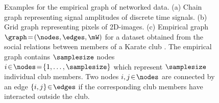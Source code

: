 \documentclass[12pt]{report}
\begin{document}
\begin{figure}[htbp]
\begin{center}
\begin{minipage}[b]{.8\textwidth} 
\begin{center}
\end{center}
\end{minipage}
\end{center}
\caption{\label{fig_graph_signals} Examples for the empirical graph of networked data. (a) 
Chain graph representing signal amplitudes of discrete time signals.  (b) Grid graph representing 
pixels of 2D-images. (c) Empirical graph $\graph\!=\!(\nodes,\edges,\mW)$ for a dataset obtained 
from the social relations between members of a Karate club \cite{Zachary77}. The empirical graph 
contains $\samplesize$ nodes $i \!\in\!\nodes\!=\!\{1,\ldots,\samplesize \}$ which represent $\samplesize$ 
individual club members. Two nodes $i,j\!\in\!\nodes$ are connected by an edge $\{i,j\}\!\in\!\edges$ if 
the corresponding club members have interacted outside the club.}
\end{figure}
\end{document}
